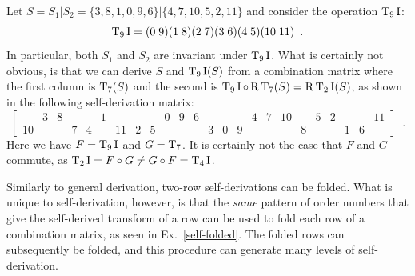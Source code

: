 \begin{example}
	\label{topSquareSideExample}
    \cite[218]{Starr1984}
    Let $S = S_1 | S_2 = \{ 3, 8, 1, 0, 9, 6 \} | \{ 4, 7, 10, 5, 2, 11 \}$ and consider the operation $\operatorname{T}_9\operatorname{I}$:
    \begin{equation}
        \operatorname{T}_9\operatorname{I} = (0 \; 9) (1 \; 8) (2 \; 7) (3 \; 6) (4 \; 5) (10 \; 11) \enspace.
    \end{equation}
    In particular, both $S_1$ and $S_2$ are invariant under $\operatorname{T}_9\operatorname{I}$. What is certainly not obvious, is that we can derive $S$ and $\operatorname{T}_9\operatorname{I}(S)$ from a combination matrix where the first column is $\operatorname{T}_7(S)$ and the second is $\operatorname{T}_9\operatorname{I} \circ \operatorname{R}\operatorname{T}_7(S) = \operatorname{R}\operatorname{T}_2\operatorname{I}(S)$, as shown in the following self-derivation matrix:
    \begin{equation}
    	\label{topSquareSideEquation}
        \left[
        \begin{array}{cccccccccccc|cccccccccccc}
            & 3 & 8 &&& 1 &&&& 0 & 9 & 6 &&&& 4 & 7 & 10 && 5 & 2 &&& 11 \\
            10 &&& 7 & 4 && 11 & 2 & 5 &&&& 3 & 0 & 9 &&&& 8 &&& 1 & 6 &
        \end{array}
        \right] \enspace.
    \end{equation}
    Here we have $F = \operatorname{T}_9\operatorname{I}$ and $G = \operatorname{T}_7$. It is certainly not the case that $F$ and $G$ commute, as $\operatorname{T}_2\operatorname{I} = F \circ G \ne G \circ F = \operatorname{T}_4\operatorname{I}$.
\end{example}

Similarly to general derivation, two-row self-derivations can be folded. What is unique to self-derivation, however, is that the \emph{same} pattern of order numbers that give the self-derived transform of a row can be used to fold each row of a combination matrix, as seen in Ex.~\ref{self-folded}. The folded rows can subsequently be folded, and this procedure can generate many levels of self-derivation.

